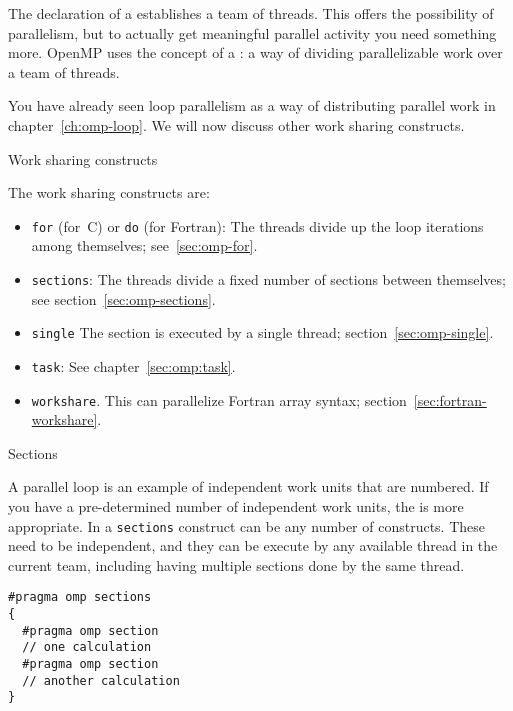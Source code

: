 
The declaration of a  establishes a team of
threads. This offers the possibility of parallelism, but to actually
get meaningful parallel activity you need something more.
OpenMP uses the concept of a : a way of dividing parallelizable work over a team of threads.

You have already seen loop parallelism
as a way of distributing parallel work
in chapter~\ref{ch:omp-loop}.
We will now discuss other work sharing constructs.

 {Work sharing constructs}
\label{sec:work-sharing}

The work sharing constructs are:
\begin{itemize}
\item \texttt{for} (for~C) or
  \texttt{do} (for Fortran): The threads divide up the loop iterations among
  themselves; see~\ref{sec:omp-for}.
\item \texttt{sections}: The threads divide a fixed number of sections
  between themselves; see section~\ref{sec:omp-sections}.
\item \texttt{single} The section is executed by a single thread;
  section~\ref{sec:omp-single}.
\item \texttt{task}: See chapter~\ref{sec:omp:task}.
\item \texttt{workshare}. This can parallelize Fortran array syntax;
  section~\ref{sec:fortran-workshare}.
\end{itemize}

 {Sections}
\label{sec:omp-sections}

A parallel loop is an example of independent work units that are numbered.
If you have a pre-determined number of independent work units, 
the  is more appropriate. In a \lstinline[language=omp]{sections} construct
can be any number of  constructs. These need to be
independent, and they can be execute by any available thread in the current team,
including having multiple sections done by the same thread.
\begin{lstlisting}[language=omp]
#pragma omp sections
{
  #pragma omp section
  // one calculation
  #pragma omp section
  // another calculation
}
\end{lstlisting}

